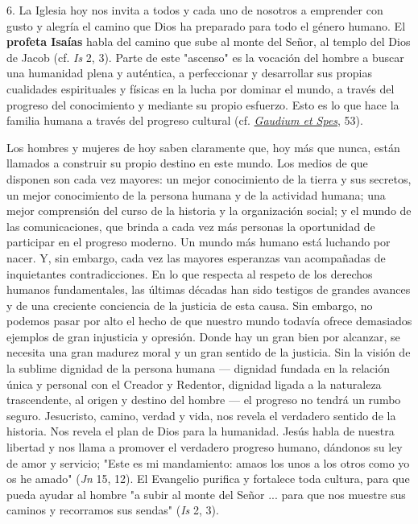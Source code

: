\begin{body}
	6. La Iglesia hoy nos invita a todos y cada uno de nosotros a emprender con gusto y alegría el camino que Dios ha preparado para todo el género humano. El \textbf{profeta Isaías} habla del camino que sube al monte del Señor, al templo del Dios de Jacob (cf. \emph{Is} 2, 3). Parte de este "ascenso" es la vocación del hombre a buscar una humanidad plena y auténtica, a perfeccionar y desarrollar sus propias cualidades espirituales y físicas en la lucha por dominar el mundo, a través del progreso del conocimiento y mediante su propio esfuerzo. Esto es lo que hace la familia humana a través del progreso cultural (cf. \href{http://www.vatican.va/archive/hist_councils/ii_vatican_council/documents/vat-ii_const_19651207_gaudium-et-spes_it.html}{\emph{\emph{Gaudium et Spes}}}, 53).
	
	Los hombres y mujeres de hoy saben claramente que, hoy más que nunca, están llamados a construir su propio destino en este mundo. Los medios de que disponen son cada vez mayores: un mejor conocimiento de la tierra y sus secretos, un mejor conocimiento de la persona humana y de la actividad humana; una mejor comprensión del curso de la historia y la organización social; y el mundo de las comunicaciones, que brinda a cada vez más personas la oportunidad de participar en el progreso moderno. Un mundo más humano está luchando por nacer. Y, sin embargo, cada vez las mayores esperanzas van acompañadas de inquietantes contradicciones. En lo que respecta al respeto de los derechos humanos fundamentales, las últimas décadas han sido testigos de grandes avances y de una creciente conciencia de la justicia de esta causa. Sin embargo, no podemos pasar por alto el hecho de que nuestro mundo todavía ofrece demasiados ejemplos de gran injusticia y opresión. Donde hay un gran bien por alcanzar, se necesita una gran madurez moral y un gran sentido de la justicia. Sin la visión de la sublime dignidad de la persona humana --- dignidad fundada en la relación única y personal con el Creador y Redentor, dignidad ligada a la naturaleza trascendente, al origen y destino del hombre --- el progreso no tendrá un rumbo seguro. Jesucristo, camino, verdad y vida, nos revela el verdadero sentido de la historia. Nos revela el plan de Dios para la humanidad. Jesús habla de nuestra libertad y nos llama a promover el verdadero progreso humano, dándonos su ley de amor y servicio; "Este es mi mandamiento: amaos los unos a los otros como yo os he amado" (\emph{Jn} 15, 12). El Evangelio purifica y fortalece toda cultura, para que pueda ayudar al hombre "a subir al monte del Señor ... para que nos muestre sus caminos y recorramos sus sendas" (\emph{Is} 2, 3).
	

\end{body}
